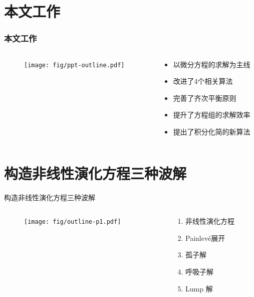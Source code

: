 \documentclass[handout]{beamer}
\newcommand{\Painleve}{Painlev{\'e}}
\begin{document}
\section{本文工作}
\begin{frame}
\frametitle{本文工作}
\begin{columns}
\begin{column}{0.7\textwidth}
\begin{figure}
\centering
\texttt{[image: fig/ppt-outline.pdf]} 
\end{figure}
\end{column}
\begin{column}{0.3\textwidth}
\begin{itemize}
\item 以微分方程的求解为主线
\item 改进了4个相关算法
\item 完善了齐次平衡原则
\item 提升了方程组的求解效率
\item 提出了积分化简的新算法
\end{itemize}
\end{column}
\end{columns}
\end{frame}

\section{构造非线性演化方程三种波解}
\begin{frame}{构造非线性演化方程三种波解}
\begin{columns}
\begin{column}{0.5\textwidth}
  \begin{figure}
    \centering
    \texttt{[image: fig/outline-p1.pdf]}
  \end{figure}
\end{column}
\begin{column}{0.5\textwidth}
  \begin{enumerate}
  \item 非线性演化方程
  \item \Painleve{}展开
  \item 孤子解
  \item 呼吸子解 
  \item Lump 解
  \end{enumerate}
\end{column}
\end{columns}
\end{frame}
\end{document}
